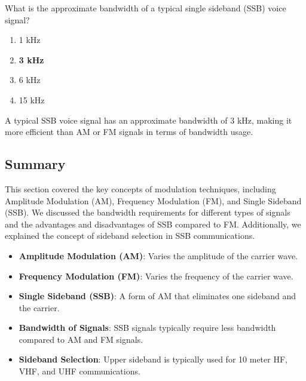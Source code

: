 
\begin{tcolorbox}[colback=gray!10!white,colframe=black!75!black,title={T8A08}]
    What is the approximate bandwidth of a typical single sideband (SSB) voice signal?
    \begin{enumerate}[label=\Alph*),noitemsep]
        \item 1 kHz
        \item \textbf{3 kHz}
        \item 6 kHz
        \item 15 kHz
    \end{enumerate}
\end{tcolorbox}
A typical SSB voice signal has an approximate bandwidth of 3 kHz, making it more efficient than AM or FM signals in terms of bandwidth usage.


\subsection*{Summary}
This section covered the key concepts of modulation techniques, including Amplitude Modulation (AM), Frequency Modulation (FM), and Single Sideband (SSB). We discussed the bandwidth requirements for different types of signals and the advantages and disadvantages of SSB compared to FM. Additionally, we explained the concept of sideband selection in SSB communications.

\begin{itemize}
    \item \textbf{Amplitude Modulation (AM)}: Varies the amplitude of the carrier wave.
    \item \textbf{Frequency Modulation (FM)}: Varies the frequency of the carrier wave.
    \item \textbf{Single Sideband (SSB)}: A form of AM that eliminates one sideband and the carrier.
    \item \textbf{Bandwidth of Signals}: SSB signals typically require less bandwidth compared to AM and FM signals.
    \item \textbf{Sideband Selection}: Upper sideband is typically used for 10 meter HF, VHF, and UHF communications.
\end{itemize}
